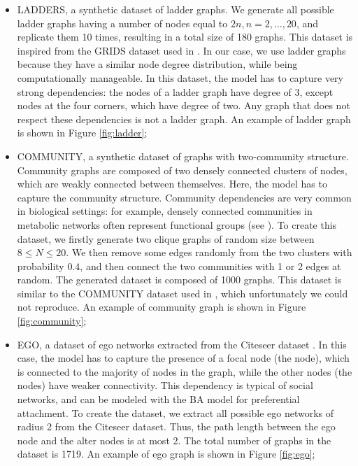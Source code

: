 \begin{itemize}
    \item LADDERS, a synthetic dataset of ladder graphs. We generate all possible ladder graphs having a number of nodes equal to $2n, n = 2, \ldots, 20$, and replicate them 10 times, resulting in a total size of 180 graphs. This dataset is inspired from the GRIDS dataset used in \citep{you2018graphrnn}. In our case, we use ladder graphs because they have a similar node degree distribution, while being computationally manageable. In this dataset, the model has to capture very strong dependencies: the nodes of a ladder graph have degree of 3, except nodes at the four corners, which have degree of two. Any graph that does not respect these dependencies is not a ladder graph. An example of ladder graph is shown in Figure \ref{fig:ladder};
    \item COMMUNITY, a synthetic dataset of graphs with two-community structure. Community graphs are composed of two densely connected clusters of nodes, which are weakly connected between themselves. Here, the model has to capture the community structure. Community dependencies are very common in biological settings: for example, densely connected communities in metabolic networks often represent functional groups (see \eg \citep{girvan2002commstructsocialbionet}). To create this dataset, we firstly generate two clique graphs of random size between $8 \leq N \leq 20$. We then remove some edges randomly from the two clusters with probability $0.4$, and then connect the two communities with 1 or 2 edges at random. The generated dataset is composed of 1000 graphs. This dataset is similar to the COMMUNITY dataset used in \citep{you2018graphrnn}, which unfortunately we could not reproduce. An example of community graph is shown in Figure \ref{fig:community};
    \item EGO, a dataset of ego networks extracted from the Citeseer dataset \citep{giles1998citeseer}. In this case, the model has to capture the presence of a focal node (the  node), which is connected to the majority of nodes in the graph, while the other nodes (the  nodes) have weaker connectivity. This dependency is typical of social networks, and can be modeled with the BA model for preferential attachment. To create the dataset, we extract all possible ego networks of radius 2 from the Citeseer dataset. Thus, the path length between the ego node and the alter nodes is at most 2. The total number of graphs in the dataset is 1719. An example of ego graph is shown in Figure \ref{fig:ego};

\end{itemize}
